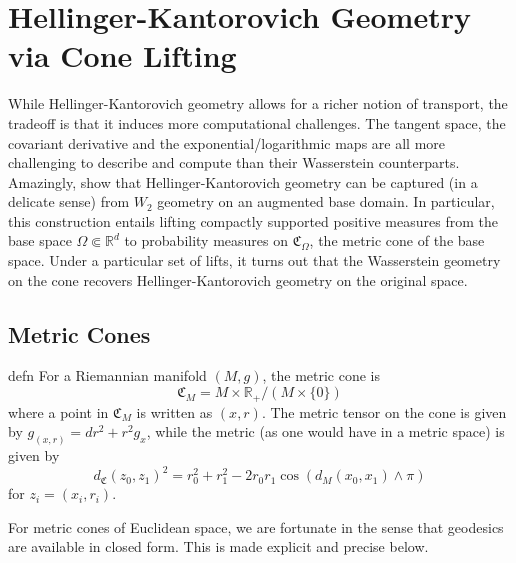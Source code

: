 \documentclass[11pt]{article}
\newcommand{\man}{M}
\begin{document}
\section{Hellinger-Kantorovich Geometry via Cone Lifting} \label{sec: HK geometry via cone}

While Hellinger-Kantorovich geometry allows for a richer notion of transport, the tradeoff is that it induces more computational challenges. The tangent space, the covariant derivative and the exponential/logarithmic maps are all more challenging to describe and compute than their Wasserstein counterparts. Amazingly, \citet{liero2016optimal} show that Hellinger-Kantorovich geometry can be captured (in a delicate sense) from $W_2$ geometry on an augmented base domain. In particular, this construction entails lifting compactly supported positive measures from the base space $\Omega \Subset \mathbb{R}^d$ to probability measures on $\mathfrak{C}_{\Omega}$, the metric cone of the base space. Under a particular set of lifts, it turns out that the Wasserstein geometry on the cone recovers Hellinger-Kantorovich geometry on the original space.

\subsection{Metric Cones}

\begin{restatable}{defn}{} \label{def: metric cone}
    For a Riemannian manifold $(\man, g)$, the metric cone is
    \[\mathfrak{C}_\man = \man \times \mathbb{R}_{+} / (M \times \{0\})\]
    where a point in $\mathfrak{C}_\man$ is written as $(x, r)$. The metric tensor on the cone is given by $g_{(x,r)} = dr^2 + r^2g_x$, while the metric (as one would have in a metric space) is given by 
    \begin{equation*}
    d_{\mathfrak{C}}(z_0, z_1)^2 = r_0^2 + r_1^2 - 2r_0r_1\cos(d_{\man}(x_0, x_1) \land \pi)
    \end{equation*}
    for $z_i = (x_i, r_i)$.
\end{restatable} 

For metric cones of Euclidean space, we are fortunate in the sense that geodesics are available in closed form. This is made explicit and precise below.
\end{document}
